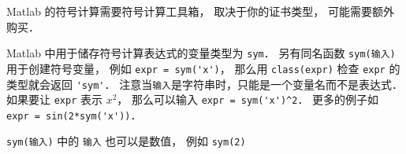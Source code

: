 
Matlab 的符号计算需要符号计算工具箱， 取决于你的证书类型， 可能需要额外购买． 

Matlab 中用于储存符号计算表达式的变量类型为 \verb|sym|．  另有同名函数 \verb|sym(输入)| 用于创建符号变量， 例如 \verb|expr = sym('x')|， 那么用 \verb|class(expr)| 检查 \verb|expr| 的类型就会返回 \verb|'sym'|． 注意当\verb|输入|是字符串时，只能是一个变量名而不是表达式． 如果要让 \verb|expr| 表示 $x^2$， 那么可以输入 \verb|expr = sym('x')^2|． 更多的例子如 \verb|expr = sin(2*sym('x'))|．

\verb|sym(输入)| 中的 \verb|输入| 也可以是数值， 例如 \verb|sym(2)|


